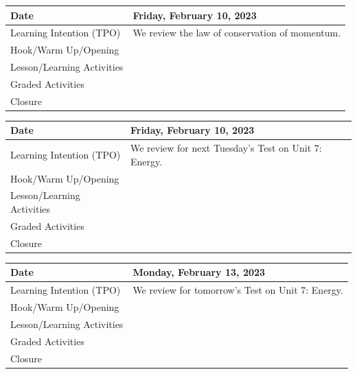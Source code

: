 \documentclass{article}
\numberwithin{equation}{section}
\numberwithin{figure}{section}
\begin{document}
\begin{tabular}{|m{}|m{}|}
    \hline  
    \cellcolor{black!20}\textbf{Date} &
    \cellcolor{black!20}\textbf{Friday, February 10, 2023} \\
    \hline
    Learning Intention (TPO) & We review the law of conservation of momentum.\\
    \hline
    Hook/Warm Up/Opening & \\
    \hline
    Lesson/Learning Activities & \\
    \hline
    Graded Activities & \\
    \hline
    Closure & \\  
    \hline
\end{tabular} 

\begin{tabular}{|m{}|m{}|}
    \hline  
    \cellcolor{black!20}\textbf{Date} &
    \cellcolor{black!20}\textbf{Friday, February 10, 2023} \\
    \hline
    Learning Intention (TPO) &  We review for next Tuesday's Test on Unit 7: Energy.\\
    \hline
    Hook/Warm Up/Opening & \\
    \hline
    Lesson/Learning Activities & \\
    \hline
    Graded Activities & \\
    \hline
    Closure & \\  
    \hline
\end{tabular} 

\begin{tabular}{|m{}|m{}|}
    \hline  
    \cellcolor{black!20}\textbf{Date} &
    \cellcolor{black!20}\textbf{Monday, February 13, 2023} \\
    \hline
    Learning Intention (TPO) & We review for tomorrow's Test on Unit 7: Energy.\\
    \hline
    Hook/Warm Up/Opening & \\
    \hline
    Lesson/Learning Activities & \\
    \hline
    Graded Activities & \\
    \hline
    Closure & \\  
    \hline
\end{tabular} 
\end{document}
